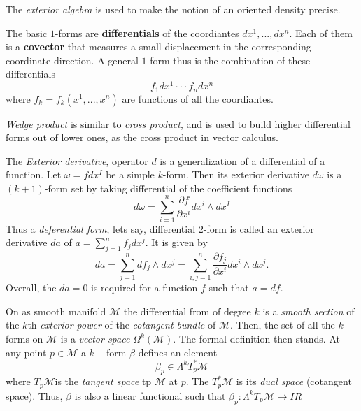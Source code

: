 The \textit{exterior algebra} is used to make the notion of an oriented density precise.

The basic $1$-forms are \textbf{differentials} of the coordiantes $dx^1,...,dx^n$. 
Each of them is a \textbf{covector} that measures a small displacement in the corresponding coordinate direction. A general $1$-form thus is the combination of these differentials 
\begin{equation}
f_1dx^1\cdot\cdot\cdot f_ndx^n
\end{equation}
where $f_k=f_k(x^1,...,x^n)$ are functions of all the coordiantes. 

\textit{Wedge product} is similar to \textit{cross product}, and is used to build higher differential forms out of lower ones, as the cross product in vector calculus.

The \textit{Exterior derivative}, operator $d$ is a generalization of a differential of a function. 
Let $\omega=fdx^I$ be a simple $k$-form. Then its exterior derivative $d\omega$ is a $(k+1)$-form set by taking differential of the coefficient functions
\begin{equation}
d\omega = \sum_{i=1}^n \frac{\partial f}{\partial x^i}dx^i \wedge dx^I
\end{equation}
Thus a \textit{deferential form}, lets say, differential $2$-form is called an exterior derivative $da$ of $a=\sum_{j=1}^{n}f_j dx^j$. 
It is given by
\begin{equation}
da = \sum_{j=1}^n df_j \wedge dx^j = \sum_{i,j=1}^n \frac{\partial f_j}{\partial x^i}dx^i\wedge dx^j.
\end{equation}
Overall, the $da=0$ is required for a function $f$ such that $a=df$.

On as smooth manifold $\mathcal{M}$ the differential from of degree $k$ is a \textit{smooth section} of the $k$th \textit{exterior power} of the \textit{cotangent bundle} of $\mathcal{M}$. 
Then, the set of all the $k-$forms on $\mathcal{M}$ is a \textit{vector space} $\Omega^k(\mathcal{M})$. 
The formal definition then stands. At any point $p\in \mathcal{M}$ a $k-$form $\beta$ defines an element 
\begin{equation}
\beta_p\in\Lambda^kT^* _p \mathcal{M}
\end{equation}
where $T_p\mathcal{M}$is the \textit{tangent space} tp $\mathcal{M}$ at $p$. The $T^* _p \mathcal{M}$ is its \textit{dual space} (cotangent space). Thus, $\beta$ is also a linear functional such that $\beta_p:\Lambda^k T_p \mathcal{M}\rightarrow I\!R$

